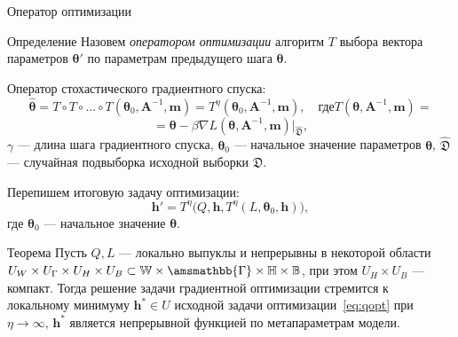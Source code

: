 \documentclass[usenames,dvipsnames,11pt,pdf,utf8,russian,aspectratio=43]{beamer}
\begin{document}
\begin{frame}{Оператор оптимизации}
\footnotesize
\begin{block}{Определение}
Назовем \textit{оператором оптимизации} алгоритм $T$ выбора вектора параметров $\boldsymbol{\theta}'$  по параметрам предыдущего шага $\boldsymbol{\theta}$.
\end{block}
Оператор стохастического градиентного спуска:
\[
	 \hat{\boldsymbol{\theta}} = T \circ T \circ \dots \circ T(\boldsymbol{\theta}_0, \mathbf{A}^{-1}, \mathbf{m}) = T^\eta(\boldsymbol{\theta}_0, \mathbf{A}^{-1}, \mathbf{m}), \quad\text{где}	T(\boldsymbol{\theta}, \mathbf{A}^{-1}, \mathbf{m}) =
\]
\[=\boldsymbol{\theta} - \beta \nabla L(\boldsymbol{\theta}, \mathbf{A}^{-1}, \mathbf{m})|_{\hat{\mathfrak{D}}}, 
\]
$\gamma$ --- длина шага градиентного спуска, $\boldsymbol{\theta}_0$ --- начальное значение параметров $\boldsymbol{\theta}$, $\hat{\mathfrak{D}}$ --- случайная подвыборка исходной выборки $\mathfrak{D}$.


Перепишем итоговую задачу оптимизации:
\[
	 \mathbf{h}' = T^\eta\bigl(Q, \mathbf{h}, T^\eta(L, \boldsymbol{\theta}_0, \mathbf{h})\bigr),
\]
где $\boldsymbol{\theta}_0$ --- начальное значение $\boldsymbol{\theta}$.

\begin{block}{Теорема}
Пусть $Q,L$ --- локально выпуклы и непрерывны в некоторой области $U_{W} \times U_{\Gamma} \times U_H \times U_B \subset \mathbb{W}\times\amsmathbb{\Gamma}\times\mathbb{H}\times\mathbb{B}$, при  этом $U_H \times U_B$ --- компакт. 
Тогда решение задачи градиентной оптимизации стремится к локальному минимуму  $\mathbf{h}^{*} \in U$ исходной задачи оптимизации~\eqref{eq:qopt} при $\eta \to \infty$,
$\mathbf{h}^{*}$ является непрерывной функцией по метапараметрам модели.
\end{block}

\end{frame}
\end{document}
